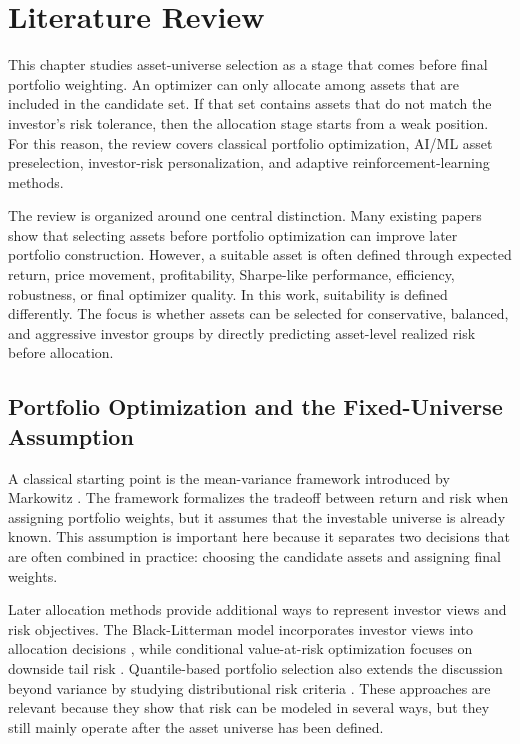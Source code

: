 \chapter{Literature Review}
\label{chap:litreview}

This chapter studies asset-universe selection as a stage that comes before final portfolio weighting. An optimizer can only allocate among assets that are included in the candidate set. If that set contains assets that do not match the investor's risk tolerance, then the allocation stage starts from a weak position. For this reason, the review covers classical portfolio optimization, AI/ML asset preselection, investor-risk personalization, and adaptive reinforcement-learning methods.

The review is organized around one central distinction. Many existing papers show that selecting assets before portfolio optimization can improve later portfolio construction. However, a suitable asset is often defined through expected return, price movement, profitability, Sharpe-like performance, efficiency, robustness, or final optimizer quality. In this work, suitability is defined differently. The focus is whether assets can be selected for conservative, balanced, and aggressive investor groups by directly predicting asset-level realized risk before allocation.

\section[Portfolio Optimization and the Fixed-Universe Assumption]{Portfolio Optimization and the Fixed-Universe Assumption}

A classical starting point is the mean-variance framework introduced by Markowitz \cite{markowitz1952}. The framework formalizes the tradeoff between return and risk when assigning portfolio weights, but it assumes that the investable universe is already known. This assumption is important here because it separates two decisions that are often combined in practice: choosing the candidate assets and assigning final weights.

Later allocation methods provide additional ways to represent investor views and risk objectives. The Black-Litterman model incorporates investor views into allocation decisions \cite{blacklitterman1992}, while conditional value-at-risk optimization focuses on downside tail risk \cite{rockafellar2000optimization}. Quantile-based portfolio selection also extends the discussion beyond variance by studying distributional risk criteria \cite{bodnar2021quantile}. These approaches are relevant because they show that risk can be modeled in several ways, but they still mainly operate after the asset universe has been defined.

